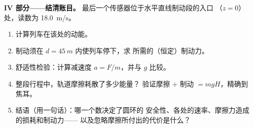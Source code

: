 \begin{problem}
\medskip
\noindent\textbf{IV 部分——结清账目。}
最后一个传感器位于水平直线制动段的入口
（$z = 0$）处，读数为 \qty{18.0}{m/s}。
\begin{enumerate}[resume]
  \item 计算列车在该处的动能。
  \item 制动须在 $d = \qty{45}{m}$ 内使列车停下，求
        所需的（恒定）制动力。
  \item 舒适性检验：计算减速度 $a = F/m$，并与 $g$ 比较。
  \item 整段行程中，轨道摩擦耗散了多少能量？
        验证摩擦 $+$ 制动 $= mgH$，精确到焦耳。
  \item 结语（用一句话）：哪一个数决定了圆环的
        安全性、各处的速率、摩擦力造成的损耗和制动力——
        以及忽略摩擦所付出的代价是什么？
\end{enumerate}
\end{problem}
